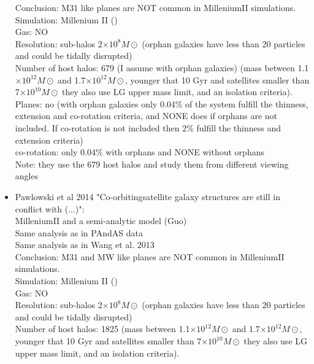 \documentclass{emulateapj}
\begin{document}
\begin{itemize}
{Conclusion: M31 like planes are NOT common in MilleniumII simulations.\\
Simulation: Millenium II ()\\
Gas: NO\\
Resolution: sub-halos 2$\times 10^8 M\odot$ (orphan galaxies have less than 20 particles and could be tidally disrupted)\\
Number of host halos: 679 (I assume with orphan galaxies) (mass between 1.1$\times 10^{12} M\odot$ and 1.7$\times 10^{12} M\odot$, younger that 10 Gyr and satellites smaller than 7$\times 10^{10} M\odot$ they also use LG upper mass limit, and an isolation criteria).\\
Planes: no (with orphan galaxies only 0.04$\%$ of the system fulfill the thinness, extension and co-rotation criteria, and NONE does if orphans are not included. If co-rotation is not included then $2\%$ fulfill the thinness and extension criteria)\\
co-rotation: only 0.04$\%$ with orphans and NONE without orphans\\
Note: they use the 679 host halos and study them from different viewing angles\\
}
\item{Pawlowski et al 2014 "Co-orbitingsatellite galaxy structures are still in conflict with (...)":\\
MilleniumII and a semi-analytic model (Guo)\\
Same analysis as in PAndAS data\\
Same analysis as in Wang et al. 2013\\
Conclusion: M31 and MW like planes are NOT common in MilleniumII simulations.\\
Simulation: Millenium II ()\\
Gas: NO\\
Resolution: sub-halos 2$\times 10^8 M\odot$ (orphan galaxies have less than 20 particles and could be tidally disrupted)\\
Number of host halos:  1825 (mass between 1.1$\times 10^{12} M\odot$ and 1.7$\times 10^{12} M\odot$, younger that 10 Gyr and satellites smaller than 7$\times 10^{10} M\odot$ they also use LG upper mass limit, and an isolation criteria).\\
}
\end{itemize}
\end{document}
